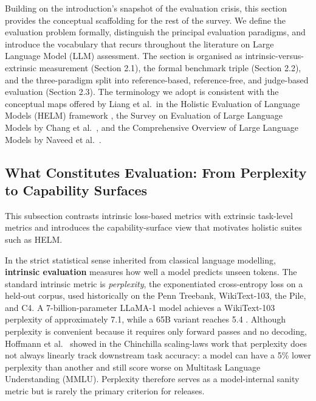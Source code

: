 \documentclass{article}
\begin{document}
Building on the introduction's snapshot of the evaluation crisis, this section provides the conceptual scaffolding for the rest of the survey. We define the evaluation problem formally, distinguish the principal evaluation paradigms, and introduce the vocabulary that recurs throughout the literature on Large Language Model (LLM) assessment. The section is organised as intrinsic-versus-extrinsic measurement (Section 2.1), the formal benchmark triple (Section 2.2), and the three-paradigm split into reference-based, reference-free, and judge-based evaluation (Section 2.3). The terminology we adopt is consistent with the conceptual maps offered by Liang et al.~in the Holistic Evaluation of Language Models (HELM) framework \cite{liang20222022}, the Survey on Evaluation of Large Language Models by Chang et al.~\cite{chang2024asurveyonevaluatio}, and the Comprehensive Overview of Large Language Models by Naveed et al.~\cite{naveed20232023}.

\subsection{What Constitutes Evaluation: From Perplexity to Capability Surfaces}\label{what-constitutes-evaluation-from-perplexity-to-capability-surfaces}

This subsection contrasts intrinsic loss-based metrics with extrinsic task-level metrics and introduces the capability-surface view that motivates holistic suites such as HELM.

In the strict statistical sense inherited from classical language modelling, \textbf{intrinsic evaluation} measures how well a model predicts unseen tokens. The standard intrinsic metric is \emph{perplexity}, the exponentiated cross-entropy loss on a held-out corpus, used historically on the Penn Treebank, WikiText-103, the Pile, and C4. A 7-billion-parameter LLaMA-1 model achieves a WikiText-103 perplexity of approximately 7.1, while a 65B variant reaches 5.4 \cite{touvron20232023}. Although perplexity is convenient because it requires only forward passes and no decoding, Hoffmann et al.~\cite{hoffmann20222022} showed in the Chinchilla scaling-laws work that perplexity does not always linearly track downstream task accuracy: a model can have a 5\% lower perplexity than another and still score worse on Multitask Language Understanding (MMLU). Perplexity therefore serves as a model-internal sanity metric but is rarely the primary criterion for releases.
\end{document}
